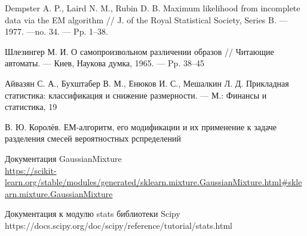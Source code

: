 \begin{thebibliography}{99}

 Dempster A. P., Laird N. M., Rubin D. B. Maximum likelihood from incomplete data via the EM algorithm // J. of the Royal Statistical Society, Series B. — 1977. —no. 34. — Pp. 1–38.

 Шлезингер М. И. О самопроизвольном различении образов // Читающие автоматы. — Киев, Наукова думка, 1965. — Pp. 38–45

 Айвазян С. А., Бухштабер В. М., Енюков И. С., Мешалкин Л. Д. Прикладная статистика: классификация и снижение размерности. — М.: Финансы и статистика, 19

 В. Ю. Королёв. ЕМ-алгоритм, его модификации и их применение к задаче разделения смесей вероятностных рспределений

 Документация GaussianMixture \\ \url{https://scikit-learn.org/stable/modules/generated/sklearn.mixture.GaussianMixture.html#sklearn.mixture.GaussianMixture}

 Документация к модулю stats библиотеки Scipy \\ https://docs.scipy.org/doc/scipy/reference/tutorial/stats.html

\end{thebibliography}